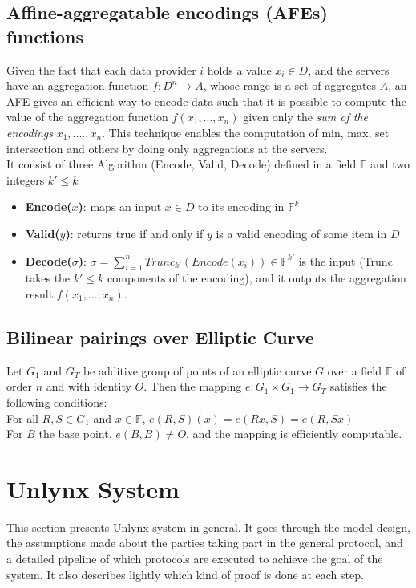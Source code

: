 \documentclass{article}
\begin{document}
\subsection*{Affine-aggregatable encodings (AFEs) functions}
Given the fact that each data provider $i$ holds a value $x_i \in D$, and the servers have an aggregation function $f : D^n \rightarrow A$, whose range is a set of aggregates $A$, an AFE gives an efficient way to encode data such that it is possible to compute the value of the aggregation function $f(x_1,...,x_n)$ given only the \textit{sum of the encodings} $x_1,....,x_n$. This technique enables the computation of min, max, set intersection and others by doing only aggregations at the servers.\\
It consist of three Algorithm (Encode, Valid, Decode) defined in a field $\mathbb{F}$ and two integers $k' \leq k$\\
\begin{itemize}
\item \textbf{Encode($x$)}: maps an input $x \in D$ to its encoding in $\mathbb{F}^k$
\item \textbf{Valid($y$)}: returns true if and only if $y$ is a valid encoding of some item in $D$
\item \textbf{Decode($\sigma$)}: $\sigma = \sum_{i=1}^{n}{Trunc_{k'}(Encode(x_i))} \in \mathbb{F}^{k'}$ is the input (Trunc takes the $k' \leq k$ components of the encoding), and it outputs the aggregation result $f(x_1,...,x_n)$.
\end{itemize}

\subsection*{Bilinear pairings over Elliptic Curve}
Let $G_1$ and $G_T$ be additive group of points of an elliptic curve $G$ over a field $\mathbb{F}$ of order $n$ and with identity $O$. Then the mapping $e: G_1 \times G_1 \rightarrow G_T$ satisfies the following conditions:\\
For all $R,S \in G_1$ and $x \in \mathbb{F}$, $e(R,S)(x) = e(Rx,S) = e(R,Sx)$\\
For $B$ the base point, $e(B,B) \neq O$, and the mapping is efficiently computable.


\section{Unlynx System}
This section presents Unlynx \cite{unlynx} system in general. It goes through the model design, the assumptions made about the parties taking part in the general protocol, and a detailed pipeline of which protocols are executed to achieve the goal of the system. It also describes lightly which kind of proof is done at each step.\\
\end{document}
